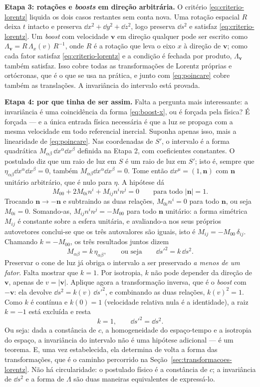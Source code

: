 \documentclass[12pt,a4paper,oneside]{book}
\theoremstyle{rgplain}
\theoremstyle{rgremark}
\begin{document}
\textbf{Etapa 3: rotações e \emph{boosts} em direção arbitrária.} O critério
\eqref{eq:criterio-lorentz} liquida os dois casos restantes sem conta nova.
Uma rotação espacial $R$ deixa $t$ intacto e preserva
$\dd x^2+\dd y^2+\dd z^2$, logo preserva $\dd s^2$ e satisfaz
\eqref{eq:criterio-lorentz}. Um \emph{boost} com velocidade
$\bm v$ em direção qualquer pode ser escrito como
$\Lambda_{\bm v}=R\,\Lambda_x(v)\,R^{-1}$, onde $R$ é a rotação que leva o
eixo $x$ à direção de $\bm v$; como cada fator satisfaz
\eqref{eq:criterio-lorentz} e a condição é fechada por produto, $\Lambda_{\bm
v}$ também satisfaz. Isso cobre todas as transformações de Lorentz próprias e
ortócronas, que é o que se usa na prática, e junto com \eqref{eq:poincare}
cobre também as translações. A invariância do intervalo está provada.

\textbf{Etapa 4: por que tinha de ser assim.} Falta a pergunta mais
interessante: a invariância é uma coincidência da forma
\eqref{eq:boost-x}, ou é forçada pela física? É forçada --- e a única entrada
física necessária é que a luz se propaga com a mesma velocidade em todo
referencial inercial. Suponha apenas isso, mais a linearidade de
\eqref{eq:poincare}. Nas coordenadas de $S'$, o intervalo é a forma quadrática
$M_{\alpha\beta}\,\dd x^\alpha\dd x^\beta$ definida na Etapa 2, com
coeficientes constantes. O postulado diz que um raio de luz em $S$ é um raio
de luz em $S'$; isto é, sempre que $\eta_{\alpha\beta}\dd x^\alpha\dd x^\beta=0$,
também $M_{\alpha\beta}\dd x^\alpha\dd x^\beta=0$. Tome então
$\dd x^\mu=(1,\bm n)$ com $\bm n$ unitário arbitrário, que é nulo para
$\eta$. A hipótese dá
\[
  M_{00}+2M_{0i}n^i+M_{ij}n^in^j=0 \qquad\text{para todo } |\bm n|=1 .
\]
Trocando $\bm n\to-\bm n$ e subtraindo as duas relações, $M_{0i}n^i=0$ para
todo $\bm n$, ou seja $M_{0i}=0$. Somando-as, $M_{ij}n^in^j=-M_{00}$ para todo
$\bm n$ unitário: a forma simétrica $M_{ij}$ é constante sobre a esfera
unitária, e avaliando-a nos seus próprios autovetores conclui-se que os três
autovalores são iguais, isto é $M_{ij}=-M_{00}\,\delta_{ij}$. Chamando
$k=-M_{00}$, os três resultados juntos dizem
\[
  M_{\alpha\beta}=k\,\eta_{\alpha\beta},
  \qquad\text{ou seja}\qquad
  \dd s'^2=k\,\dd s^2 .
\]
Preservar o cone de luz já obriga o intervalo a ser preservado \emph{a menos
de um fator}. Falta mostrar que $k=1$. Por isotropia, $k$ não pode depender da
direção de $\bm v$, apenas de $v=|\bm v|$. Aplique agora a transformação
inversa, que é o \emph{boost} com $-\bm v$: ela devolve $\dd s^2=k(v)\,\dd
s'^2$, e combinando as duas relações, $k(v)^2=1$. Como $k$ é contínua e
$k(0)=1$ (velocidade relativa nula é a identidade), a raiz $k=-1$ está
excluída e resta
\[
  k=1,\qquad \dd s'^2=\dd s^2 .
\]
Ou seja: dada a constância de $c$, a homogeneidade do espaço-tempo e a
isotropia do espaço, a invariância do intervalo não é uma hipótese adicional
--- é um teorema. E, uma vez estabelecida, ela determina de volta a forma das
transformações, que é o caminho percorrido na
Seção~\ref{sec:transformacoes-lorentz}. Não há circularidade: o postulado
físico é a constância de $c$; a invariância de $\dd s^2$ e a forma de
$\Lambda$ são duas maneiras equivalentes de expressá-lo.
\end{document}
